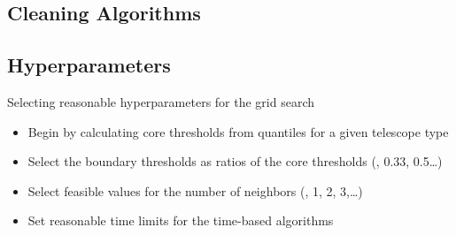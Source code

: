 \subsection{Cleaning Algorithms}%
\label{sub:Cleaning_algorithms}

    {%
    
    }
    {%
    
    }

\subsection{Hyperparameters}%
\label{sub:Hyperparameters}
\begin{frame}{Selecting reasonable hyperparameters for the grid search}
    \begin{overlayarea}{\textwidth}{\textheight}
        \begin{itemize}
            \item<1-> Begin by calculating core thresholds from quantiles for a given telescope type
            \item<3-> Select the boundary thresholds as ratios of the core thresholds (, 0.33, 0.5\dots)
            \item<4-> Select feasible values for the number of neighbors (, 1, 2, 3,\dots)
            \item<5-> Set reasonable time limits for the time-based algorithms
        \end{itemize}
    \end{overlayarea}
\end{frame}